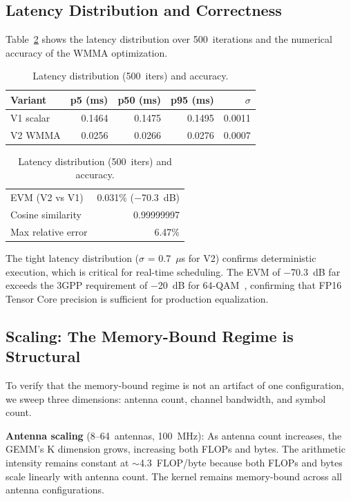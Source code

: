 \subsection{Latency Distribution and Correctness}

Table~\ref{tab:rigor} shows the latency distribution over 500~iterations and the numerical accuracy of the WMMA optimization.

\begin{table}[h]
\centering
\small
\caption{Latency distribution (500~iters) and accuracy.}
\label{tab:rigor}
\begin{tabular}{lrrrr}
\toprule
Variant & p5 (ms) & p50 (ms) & p95 (ms) & $\sigma$ \\
\midrule
V1 scalar & 0.1464 & 0.1475 & 0.1495 & 0.0011 \\
V2 WMMA & 0.0256 & 0.0266 & 0.0276 & 0.0007 \\
\bottomrule
\end{tabular}
\vspace{4pt}

\begin{tabular}{lr}
EVM (V2 vs V1) & 0.031\% ($-$70.3~dB) \\
Cosine similarity & 0.99999997 \\
Max relative error & 6.47\% \\
\bottomrule
\end{tabular}
\end{table}

The tight latency distribution ($\sigma$ = 0.7~$\mu$s for V2) confirms deterministic execution, which is critical for real-time scheduling. The EVM of $-$70.3~dB far exceeds the 3GPP requirement of $-$20~dB for 64-QAM~\cite{3gpp_38104}, confirming that FP16 Tensor Core precision is sufficient for production equalization.

\subsection{Scaling: The Memory-Bound Regime is Structural}

To verify that the memory-bound regime is not an artifact of one configuration, we sweep three dimensions: antenna count, channel bandwidth, and symbol count.

\textbf{Antenna scaling} (8--64~antennas, 100~MHz): As antenna count increases, the GEMM's K dimension grows, increasing both FLOPs and bytes. The arithmetic intensity remains constant at $\sim$4.3~FLOP/byte because both FLOPs and bytes scale linearly with antenna count. The kernel remains memory-bound across all antenna configurations.

